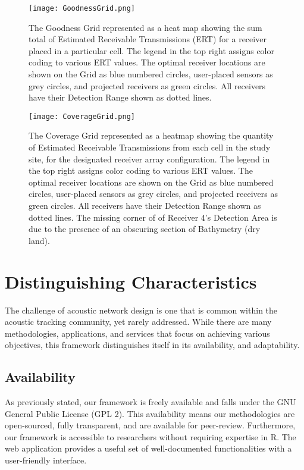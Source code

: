 \begin{figure}[ht]
	\texttt{[image: GoodnessGrid.png]}
	\caption{The Goodness Grid represented as a heat map showing the sum total of Estimated Receivable Transmissions (ERT) for a receiver placed in a particular cell.  The legend in the top right assigns color coding to various ERT values. The optimal receiver locations are shown on the Grid as blue numbered circles, user-placed sensors as grey circles, and projected receivers as green circles.  All receivers have their Detection Range shown as dotted lines.\label{GoodnessGraph}} 
\end{figure}

\begin{figure}[ht]
	\texttt{[image: CoverageGrid.png]}
	\caption{The Coverage Grid represented as a heatmap showing the quantity of Estimated Receivable Transmissions from each cell in the study site, for the designated receiver array configuration.  The legend in the top right assigns color coding to various ERT values.  The optimal receiver locations are shown on the Grid as blue numbered circles, user-placed sensors as grey circles, and projected receivers as green circles.  All receivers have their Detection Range shown as dotted lines.  The missing corner of of Receiver 4's Detection Area is due to the presence of an obscuring section of Bathymetry (dry land).\label{coverageGraph}}
\end{figure}
	
\section{Distinguishing Characteristics}
The challenge of acoustic network design is one that is common within the acoustic tracking community, yet rarely addressed.  While there are many methodologies, applications, and services that focus on achieving various objectives, this framework distinguishes itself in its availability, and adaptability.  

\subsection{Availability}
As previously stated, our framework is freely available \cite{acousitcdeploy} and falls under the GNU General Public License (GPL 2).  This availability means our methodologies are open-sourced, fully transparent, and are available for peer-review.  Furthermore, our framework is accessible to researchers without requiring expertise in R.  The web application provides a useful set of well-documented functionalities with a user-friendly interface.

